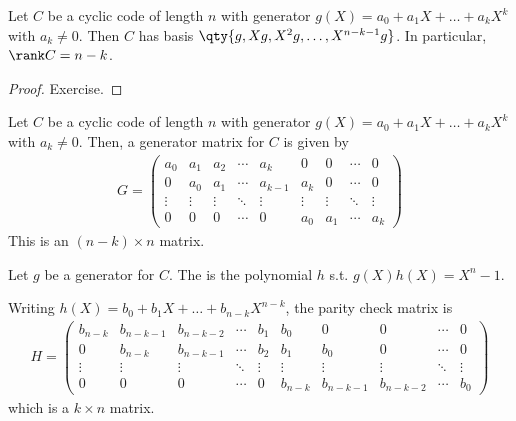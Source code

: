 \begin{lemma}
    Let $C$ be a cyclic code of length $n$ with generator $g(X) = a_0 + a_1 X + \dots + a_k X^k$ with $a_k \neq 0$.
    Then $C$ has basis $\qty{g, Xg, X^2g, \dots, X^{n-k-1}g}$.
    In particular, $\rank C = n - k$.
\end{lemma}

\begin{proof}
    Exercise.
\end{proof}

\begin{corollary}
    Let $C$ be a cyclic code of length $n$ with generator $g(X) = a_0 + a_1 X + \dots + a_k X^k$ with $a_k \neq 0$.
    Then, a generator matrix for $C$ is given by
    \begin{align*}
        G = \begin{pmatrix}
            a_0 & a_1 & a_2 & \cdots & a_k & 0 & 0 & \cdots & 0 \\
            0 & a_0 & a_1 & \cdots & a_{k-1} & a_k & 0 & \cdots & 0 \\
            \vdots & \vdots & \vdots & \ddots & \vdots & \vdots & \vdots & \ddots & \vdots \\
            0 & 0 & 0 & \cdots & 0 & a_0 & a_1 & \cdots & a_k
        \end{pmatrix}
    \end{align*}
    This is an $(n - k) \times n$ matrix.
\end{corollary}

\begin{definition}
    Let $g$ be a generator for $C$.
    The  is the polynomial $h$ s.t. $g(X) h(X) = X^n - 1$.
\end{definition}

\begin{corollary}
    Writing $h(X) = b_0 + b_1 X + \dots + b_{n-k} X^{n-k}$, the parity check matrix is
    \begin{align*}
        H = \begin{pmatrix}
            b_{n-k} & b_{n-k-1} & b_{n-k-2} & \cdots & b_1 & b_0 & 0 & 0 & \cdots & 0 \\
            0 & b_{n-k} & b_{n-k-1} & \cdots & b_2 & b_1 & b_0 & 0 & \cdots & 0 \\
            \vdots & \vdots & \vdots & \ddots & \vdots & \vdots & \vdots & \vdots & \ddots & \vdots \\
            0 & 0 & 0 & \cdots & 0 & b_{n-k} & b_{n-k-1} & b_{n-k-2} & \cdots & b_0
        \end{pmatrix}
    \end{align*}
    which is a $k \times n$ matrix.
\end{corollary}

